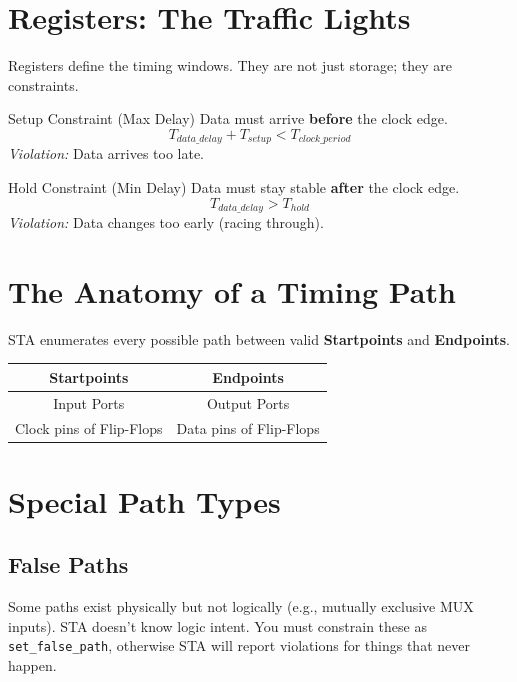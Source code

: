 \documentclass[11pt, a4paper]{article}
\begin{document}
\section{Registers: The Traffic Lights}

Registers define the timing windows. They are not just storage; they are constraints.

\begin{eqbox}{Setup Constraint (Max Delay)}
Data must arrive \textbf{before} the clock edge.
\[ T_{data\_delay} + T_{setup} < T_{clock\_period} \]
\textit{Violation:} Data arrives too late.
\end{eqbox}

\begin{eqbox}{Hold Constraint (Min Delay)}
Data must stay stable \textbf{after} the clock edge.
\[ T_{data\_delay} > T_{hold} \]
\textit{Violation:} Data changes too early (racing through).
\end{eqbox}

\section{The Anatomy of a Timing Path}

STA enumerates every possible path between valid \textbf{Startpoints} and \textbf{Endpoints}.

\begin{center}
\begin{tabular}{|c|c|}
\hline
\textbf{Startpoints} & \textbf{Endpoints} \\
\hline
Input Ports & Output Ports \\
Clock pins of Flip-Flops & Data pins of Flip-Flops \\
\hline
\end{tabular}
\end{center}

\section{Special Path Types}

\subsection{False Paths}
Some paths exist physically but not logically (e.g., mutually exclusive MUX inputs). STA doesn't know logic intent. You must constrain these as \texttt{set\_false\_path}, otherwise STA will report violations for things that never happen.
\end{document}
